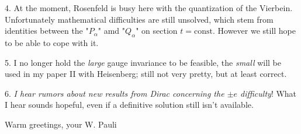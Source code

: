 \documentclass{article}
\begin{document}
4. At the moment, Rosenfeld is busy here with the quantization of the Vierbein. Unfortunately mathematical difficulties are still unsolved, which stem from identities between the "$P_\alpha$" amd "$Q_\alpha$" on section $t=\text{const}$. However we still hope to be able to cope with it.

5. I no longer hold the \textit{large} gauge invariance to be feasible, the \textit{small} will be used in my paper II with Heisenberg; still not very pretty, but at least correct.

6. \textit{I hear rumors about new results from Dirac concerning the $\pm e$ difficulty}! What I hear sounds hopeful, even if a definitive solution still isn't available.

Warm greetings, your W. Pauli
\end{document}
